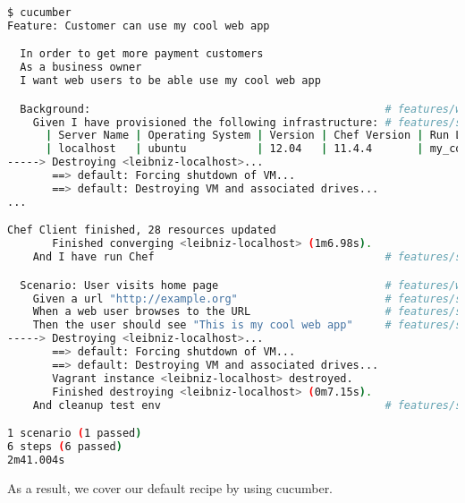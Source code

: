 \begin{lstlisting}[language=Bash,label=lst:testing-cucumber-spec7]
$ cucumber
Feature: Customer can use my cool web app

  In order to get more payment customers
  As a business owner
  I want web users to be able use my cool web app

  Background:                                              # features/working_web_page.feature:7
    Given I have provisioned the following infrastructure: # features/step_definitions/working_web_page.rb:1
      | Server Name | Operating System | Version | Chef Version | Run List             |
      | localhost   | ubuntu           | 12.04   | 11.4.4       | my_cool_app::default |
-----> Destroying <leibniz-localhost>...
       ==> default: Forcing shutdown of VM...
       ==> default: Destroying VM and associated drives...
...

Chef Client finished, 28 resources updated
       Finished converging <leibniz-localhost> (1m6.98s).
    And I have run Chef                                    # features/step_definitions/working_web_page.rb:5

  Scenario: User visits home page                          # features/working_web_page.feature:14
    Given a url "http://example.org"                       # features/step_definitions/working_web_page.rb:10
    When a web user browses to the URL                     # features/step_definitions/working_web_page.rb:14
    Then the user should see "This is my cool web app"     # features/step_definitions/working_web_page.rb:21
-----> Destroying <leibniz-localhost>...
       ==> default: Forcing shutdown of VM...
       ==> default: Destroying VM and associated drives...
       Vagrant instance <leibniz-localhost> destroyed.
       Finished destroying <leibniz-localhost> (0m7.15s).
    And cleanup test env                                   # features/step_definitions/working_web_page.rb:25

1 scenario (1 passed)
6 steps (6 passed)
2m41.004s
\end{lstlisting}

As a result, we cover our default recipe by using cucumber.